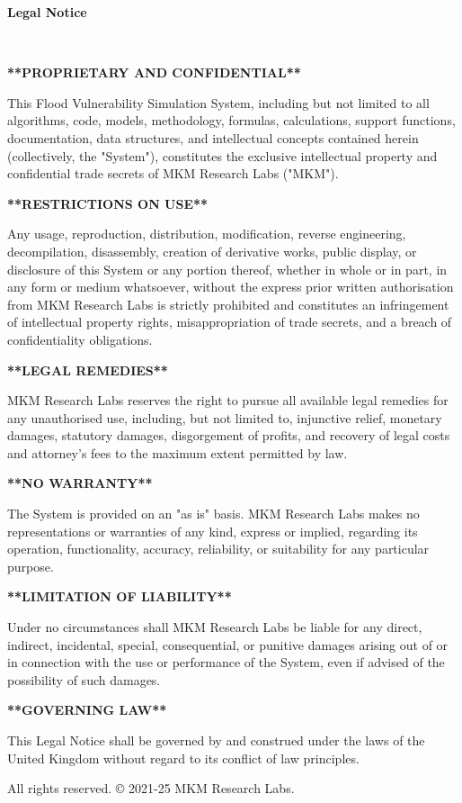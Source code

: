\documentclass{article}
\begin{document}
\begin{center}
\large\textbf{Legal Notice}

\vspace{1em}
\
\noindent

\textbf{**PROPRIETARY AND CONFIDENTIAL**}

This Flood Vulnerability Simulation System, including but not limited to all algorithms, code, models, methodology, formulas, calculations, support functions, documentation, data structures, and intellectual concepts contained herein (collectively, the "System"), constitutes the exclusive intellectual property and confidential trade secrets of MKM Research Labs ("MKM").

\textbf{**RESTRICTIONS ON USE**}

Any usage, reproduction, distribution, modification, reverse engineering, decompilation, disassembly, creation of derivative works, public display, or disclosure of this System or any portion thereof, whether in whole or in part, in any form or medium whatsoever, without the express prior written authorisation from MKM Research Labs is strictly prohibited and constitutes an infringement of intellectual property rights, misappropriation of trade secrets, and a breach of confidentiality obligations.

\textbf{**LEGAL REMEDIES**}

MKM Research Labs reserves the right to pursue all available legal remedies for any unauthorised use, including, but not limited to, injunctive relief, monetary damages, statutory damages, disgorgement of profits, and recovery of legal costs and attorney's fees to the maximum extent permitted by law.

\textbf{**NO WARRANTY**}

The System is provided on an "as is" basis. MKM Research Labs makes no representations or warranties of any kind, express or implied, regarding its operation, functionality, accuracy, reliability, or suitability for any particular purpose.

\textbf{**LIMITATION OF LIABILITY**}

Under no circumstances shall MKM Research Labs be liable for any direct, indirect, incidental, special, consequential, or punitive damages arising out of or in connection with the use or performance of the System, even if advised of the possibility of such damages.

\textbf{**GOVERNING LAW**}

This Legal Notice shall be governed by and construed under the laws of the United Kingdom without regard to its conflict of law principles.


\vspace{1em}

\noindent All rights reserved. © 2021-25 MKM Research Labs.

\vspace{2em}
\end{center}
\clearpage
\end{document}
